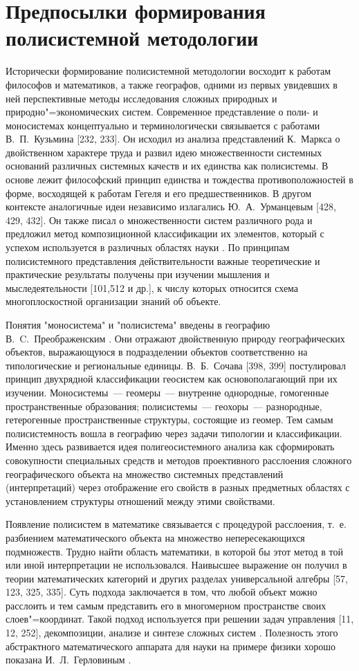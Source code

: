 \documentclass[14pt,draft,openany]{extbook}
\begin{document}
\section{Предпосылки формирования полисистемной методологии}

Исторически формирование полисистемной методологии восходит к работам философов и математиков, а также географов, одними из первых увидевших в ней перспективные методы исследования сложных природных и природно"=экономических систем. Современное представление о поли- и моносистемах концептуально и терминологически связывается с работами В.~П.~Кузьмина [232, 233]. Он исходил из анализа представлений К.~Маркса о двойственном характере труда и развил идею множественности системных оснований различных системных качеств и их единства как полисистемы. В основе лежит философский принцип единства и тождества противоположностей в форме, восходящей к работам Гегеля и его предшественников. В другом контексте аналогичные идеи независимо излагались Ю.~А.~Урманцевым [428, 429, 432]. Он также писал о множественности систем различного рода и предложил метод композиционной классификации их элементов, который с успехом используется в различных областях науки \cite{b381}. По принципам полисистемного представления действительности важные теоретические и практические результаты получены при изучении мышления и мыследеятельности [101,512 и др.], к числу которых относится схема многоплоскостной организации знаний об объекте.

Понятия "моносистема" и "полисистема" введены в географию В.~C.~Преображенским \cite{b338}. Они отражают двойственную природу географических объектов, выражающуюся в подразделении объектов соответственно на типологические и региональные единицы.  В.~Б.~Сочава [398, 399] постулировал принцип двухрядной классификации геосистем как основополагающий при их изучении. Моносистемы~--- геомеры~--- внутренне однородные, гомогенные пространственные образования; полисистемы~--- геохоры~--- разнородные, гетерогенные пространственные структуры, состоящие из геомер. Тем самым полисистемность вошла в географию через задачи типологии и классификации. Именно здесь развивается идея полигеосистемного анализа как сформировать совокупности специальных средств и методов проективного расслоения сложного географического объекта на множество системных представлений (интерпретаций) через отображение его свойств в разных предметных областях с установлением структуры отношений между этими свойствами.

Появление полисистем в математике связывается с процедурой расслоения, т.~е. разбиением математического объекта на множество непересекающихся подмножеств. Трудно найти область математики, в которой бы этот метод в той или иной интерпретации не использовался. Наивысшее выражение он получил в теории математических категорий и других разделах универсальной алгебры [57, 123, 325, 335]. Суть подхода заключается в том, что любой объект можно расслоить и тем самым представить его в многомерном пространстве своих слоев"=координат. Такой подход используется при решении задач управления [11, 12, 252], декомпозиции, анализе и синтезе сложных систем \cite{b391}. Полезность этого абстрактного математического аппарата для науки на примере физики хорошо показана И.~Л.~Герловиным \cite{b104}.
\end{document}
